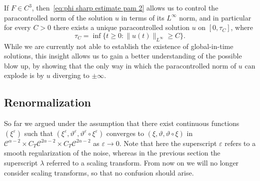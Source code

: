 \documentclass[a4paper,11pt]{article}
\theoremstyle{remark}
\newcommand{\CC}{\ensuremath{\mathscr{C}}}
\newcommand{\reso}{\,\mathord{\circ}\,}
\begin{document}
If $F \in C^3$, then~\eqref{eq:phi sharp estimate pam 2} allows us to control the paracontrolled norm of the solution $u$ in terms of its $L^\infty$ norm, and in particular for every $C > 0$ there exists a unique paracontrolled solution $u$ on $[0,\tau_C]$, where
\[
   \tau_C = \inf\{ t \geqslant 0: \| u(t) \|_{L^\infty} \ge C\}.
\]
While we are currently not able to establish the existence of global-in-time solutions, this insight allows us to gain a better understanding of the possible blow up, by showing that the only way in which the paracontrolled norm of $u$ can explode is by $u$ diverging to $\pm \infty$.

\subsection{Renormalization}

So far we argued under the assumption that there exist continuous functions $(\xi^\varepsilon)$ such that $(\xi^\varepsilon,\vartheta^\varepsilon, \vartheta^{\varepsilon} \reso \xi^{\varepsilon})$ converges to $(\xi,\vartheta, \vartheta \reso \xi)$ in $\CC^{\alpha-2} \times C_{T} \CC^{2 \alpha -2} \times C_T \CC^{2\alpha-2}$ as $\varepsilon \rightarrow 0$. Note that here the superscript $\varepsilon$ refers to a smooth regularization of the noise, whereas in the previous section the
superscript $\lambda$ referred to a scaling transform. From now on we will no longer
consider scaling transforms, so that no confusion should arise.
\end{document}
